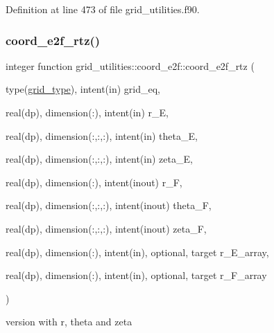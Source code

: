 Definition at line 473 of file grid\+\_\+utilities.\+f90.

\mbox{\label{interfacegrid__utilities_1_1coord__e2f_aa4cc89261b595ef43acdb171c448e7d5}} 
\subsubsection{\texorpdfstring{coord\+\_\+e2f\+\_\+rtz()}{coord\_e2f\_rtz()}}
{\footnotesize\ttfamily integer function grid\+\_\+utilities\+::coord\+\_\+e2f\+::coord\+\_\+e2f\+\_\+rtz (\begin{DoxyParamCaption}\item[{type(\hyperlink{structgrid__vars_1_1grid__type}{grid\+\_\+type}), intent(in)}]{grid\+\_\+eq,  }\item[{real(dp), dimension(\+:), intent(in)}]{r\+\_\+E,  }\item[{real(dp), dimension(\+:,\+:,\+:), intent(in)}]{theta\+\_\+E,  }\item[{real(dp), dimension(\+:,\+:,\+:), intent(in)}]{zeta\+\_\+E,  }\item[{real(dp), dimension(\+:), intent(inout)}]{r\+\_\+F,  }\item[{real(dp), dimension(\+:,\+:,\+:), intent(inout)}]{theta\+\_\+F,  }\item[{real(dp), dimension(\+:,\+:,\+:), intent(inout)}]{zeta\+\_\+F,  }\item[{real(dp), dimension(\+:), intent(in), optional, target}]{r\+\_\+\+E\+\_\+array,  }\item[{real(dp), dimension(\+:), intent(in), optional, target}]{r\+\_\+\+F\+\_\+array }\end{DoxyParamCaption})}



version with r, theta and zeta 


